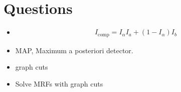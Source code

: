 \newpage
\chapter{Questions}
\begin{itemize}
	\item 
	\begin{gather*}
		I_{\text{comp}}=I_{\alpha}I_{a}+\left( 1-I_{\alpha} \right)I_b
	\end{gather*}
	\item MAP, Maximum a posteriori detector.
	\item graph cuts
	\item Solve MRFs with graph cuts
\end{itemize}
